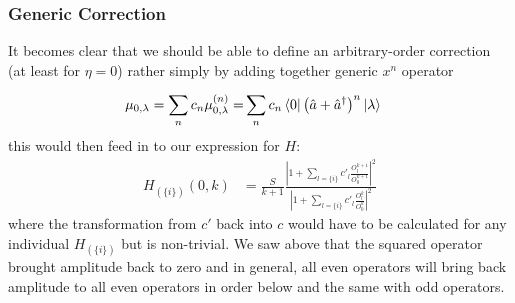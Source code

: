\subsubsection{Generic Correction}
It becomes clear that we should be able to define an arbitrary-order correction (at least for $\eta=0$) rather simply by adding together generic $x^n$ operator

\begin{align*}
	\mu_{0,\lambda} = \sum_n c_n \mu^{(n)}_{0,\lambda} =& \sum_n c_n \bra{0} \left(\hat{a} + \hat{a}^{\dagger}\right)^n  \ket{\lambda}
\end{align*}
this would then feed in to our expression for $H$:
\begin{align}
	H_{(\{i\})}(0,k)&= \frac{S}{k+1}   \frac{ \left|1 + \sum_{l = \{i\}} c'_l \frac{O_{l}^{k+1}}{O_{0}^{k+1}}  \right|^2}{\left|1 + \sum_{l = \{i\}} c'_l \frac{O_{l}^{k} }{O_{0}^{k}}\right|^2}
\end{align}
where the transformation from $c'$ back into $c$ would have to be calculated for any individual  $H_{(\{i\})}$ but is non-trivial.  We saw above that the squared operator brought amplitude back to zero and in general, all even operators will bring back amplitude to all even operators in order below and the same with odd operators.

